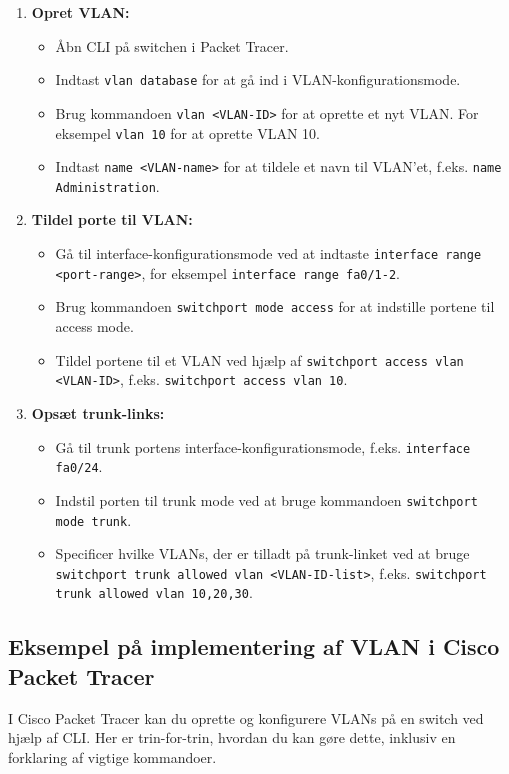 \begin{enumerate}
	\item \textbf{Opret VLAN:}
	\begin{itemize}
		\item Åbn CLI på switchen i Packet Tracer.
		\item Indtast \texttt{vlan database} for at gå ind i VLAN-konfigurationsmode.
		\item Brug kommandoen \texttt{vlan <VLAN-ID>} for at oprette et nyt VLAN. For eksempel \texttt{vlan 10} for at oprette VLAN 10.
		\item Indtast \texttt{name <VLAN-name>} for at tildele et navn til VLAN'et, f.eks. \texttt{name Administration}.
	\end{itemize}
	
	\item \textbf{Tildel porte til VLAN:}
	\begin{itemize}
		\item Gå til interface-konfigurationsmode ved at indtaste \texttt{interface range <port-range>}, for eksempel \texttt{interface range fa0/1-2}.
		\item Brug kommandoen \texttt{switchport mode access} for at indstille portene til access mode.
		\item Tildel portene til et VLAN ved hjælp af \texttt{switchport access vlan <VLAN-ID>}, f.eks. \texttt{switchport access vlan 10}.
	\end{itemize}
	
	\item \textbf{Opsæt trunk-links:}
	\begin{itemize}
		\item Gå til trunk portens interface-konfigurationsmode, f.eks. \texttt{interface fa0/24}.
		\item Indstil porten til trunk mode ved at bruge kommandoen \texttt{switchport mode trunk}.
		\item Specificer hvilke VLANs, der er tilladt på trunk-linket ved at bruge \texttt{switchport trunk allowed vlan <VLAN-ID-list>}, f.eks. \texttt{switchport trunk allowed vlan 10,20,30}.
	\end{itemize}
\end{enumerate}

\subsection{Eksempel på implementering af VLAN i Cisco Packet Tracer}
I Cisco Packet Tracer kan du oprette og konfigurere VLANs på en switch ved hjælp af CLI. Her er trin-for-trin, hvordan du kan gøre dette, inklusiv en forklaring af vigtige kommandoer.

